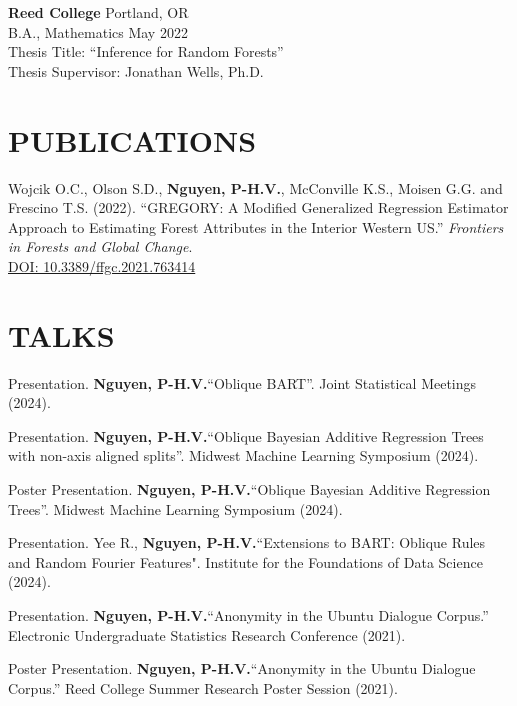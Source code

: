 \documentclass[margin]{res}
\def\pvn{\textbf{Nguyen, P-H.V.}}
\begin{document}
\begin{resume}
                {\bf Reed College} \hfill Portland, OR \\
                B.A., Mathematics \hfill May 2022 \\
                Thesis Title: ``Inference for Random Forests'' \\
                Thesis Supervisor: Jonathan Wells, Ph.D.
  
  


\section{PUBLICATIONS}

Wojcik O.C., Olson S.D., \pvn, McConville K.S., Moisen G.G. and Frescino T.S. (2022). ``GREGORY: A Modified Generalized Regression Estimator Approach to Estimating Forest Attributes in the Interior Western US.'' \textit{Frontiers in Forests and Global Change}. \\ \href{https://doi.org/10.3389/ffgc.2021.763414}{DOI: 10.3389/ffgc.2021.763414}



\section{TALKS}

Presentation. \pvn ``Oblique BART''. Joint Statistical Meetings (2024).

Presentation. \pvn ``Oblique Bayesian Additive Regression Trees with non-axis aligned splits''. Midwest Machine Learning Symposium (2024).

Poster Presentation. \pvn ``Oblique Bayesian Additive Regression Trees''. Midwest Machine Learning Symposium (2024).

Presentation. Yee R., \pvn  ``Extensions to BART: Oblique Rules and Random Fourier Features". Institute for the Foundations of Data Science (2024).

Presentation. \pvn ``Anonymity in the Ubuntu Dialogue Corpus.” Electronic Undergraduate Statistics Research Conference (2021).

Poster Presentation. \pvn ``Anonymity in the Ubuntu Dialogue Corpus.” Reed College Summer Research Poster Session (2021).


\end{resume}
\end{document}
